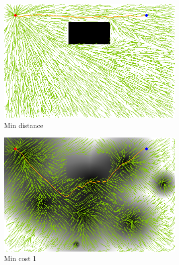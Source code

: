 \documentclass{article}
\begin{document}
\begin{figure}[h!]
	\centering
	\begin{subfigure}[b]{0.3\linewidth}
		\centering
		\includegraphics[width=\textwidth]{fig/sim4-obstacle/MORRTstar01-1-0.png}
		\caption{Min distance}
		\label{fig:sim:obs:distance}
	\end{subfigure}
	\begin{subfigure}[b]{0.3\linewidth}
		\centering
		\includegraphics[width=\textwidth]{fig/sim4-obstacle/MORRTstar01-1-1.png}
		\caption{Min cost 1}
		\label{fig:sim:obs:fitness1}
	\end{subfigure}  \\
	\begin{subfigure}[b]{0.3\linewidth}
		\centering

\end{subfigure}
\end{figure}
\end{document}
